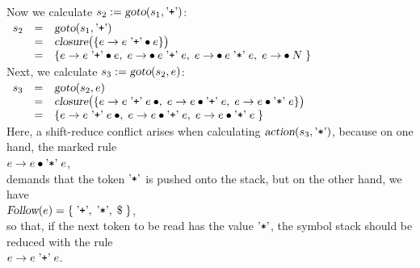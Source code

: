 \)
\\[0.2cm]
Now we calculate \(s_2 := \textsl{goto}(s_1, \mbox{'\texttt{+}'})\):
\\[0.2cm]
\hspace*{1.3cm}
\(
\begin{array}[t]{lcl}
  s_2 & = & \textsl{goto}(s_1, \saquoted{+})  \\
      & = & \textsl{closure}\bigl(\{ e \rightarrow e \;\saquoted{+} \mdot e \}\bigr) \\
      & = & \{ e \rightarrow e \;\saquoted{+} \mdot e,\;
               e \rightarrow \mdot e \;\saquoted{+}\; e,\;
               e \rightarrow \mdot e \;\saquoted{*}\; e,\;
               e \rightarrow \mdot N\;
            \}
\end{array}
\)
\\[0.2cm] 
Next, we calculate \(s_3 := \textsl{goto}(s_2, e)\):
\\[0.2cm]
\hspace*{1.3cm}
\(
\begin{array}[t]{lcl}
  s_3 & = & \textsl{goto}(s_2, e)  \\
      & = & \textsl{closure}\bigl(\{  
               e \rightarrow e \;\saquoted{+}\; e \mdot,\;
               e \rightarrow e \mdot \saquoted{+}\; e,\;
               e \rightarrow e \mdot \saquoted{*}\; e \}\bigr) \\
      & = & \{ e \rightarrow e \;\saquoted{+}\; e \mdot,\;
               e \rightarrow e \mdot \saquoted{+}\; e,\;
               e \rightarrow e \mdot \saquoted{*}\; e \;
            \}
\end{array}
\)
\\[0.2cm]
Here, a shift-reduce conflict arises when calculating \(\textsl{action}(s_3, \mbox{'\texttt{*}'})\),
because on one hand, the marked rule 
\\[0.2cm]
\hspace*{1.3cm}
\(e \rightarrow e \mdot \saquoted{*}\; e\), 
\\[0.2cm]
demands that the token \(\mbox{'\texttt{*}'}\) is pushed onto the stack, but on the other hand, we have
\\[0.2cm]
\hspace*{1.3cm}
\(\textsl{Follow}(e) = \{ \;\saquoted{+}, \;\saquoted{*}, \;\symbol{36}\; \}\), 
\\[0.2cm]
so that, if the next token to be read has the value \(\mbox{'\texttt{*}'}\), the symbol stack should be reduced with the rule 
\\[0.2cm]
\hspace*{1.3cm}
\(e \rightarrow e \;\mbox{'\texttt{+}'}\; e\).
\vspace*{0.3cm}

